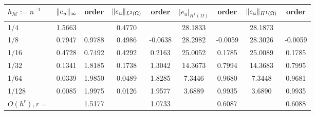 \begin{tabular}{lcccccccc}
    \hline
    $h_\mathcal{M}:=n^{-1}$ & $\lVert e_u\rVert_\infty$ & order & 
    $\lVert e_u\rVert_{L^2(\Omega)}$ & order & $|e_u|_{H^1(\Omega)}$ & order &
    $\lVert e_u\rVert_{H^1(\Omega)}$ & order \Tstrut\Bstrut \\
    \hline
      1/4    &1.5663    &          &0.4770    &           &28.1833    &           &28.1873    &       \Tstrut\\
      1/8    &0.7947    &0.9788    &0.4986    &-0.0638    &28.2982    &-0.0059    &28.3026    &-0.0059\\
     1/16    &0.4728    &0.7492    &0.4292    & 0.2163    &25.0052    & 0.1785    &25.0089    & 0.1785\\
     1/32    &0.1341    &1.8185    &0.1738    & 1.3042    &14.3673    & 0.7994    &14.3683    & 0.7995\\
     1/64    &0.0339    &1.9850    &0.0489    & 1.8285    & 7.3446    & 0.9680    & 7.3448    & 0.9681\\
    1/128    &0.0085    &1.9975    &0.0126    & 1.9577    & 3.6889    & 0.9935    & 3.6890    & 0.9935\Bstrut\\ \hline\Tstrut
$O(h^r),r=$  &          &1.5177    &          & 1.0733    &           & 0.6087    &           & 0.6088\Bstrut\\ 
    \hline
\end{tabular}
